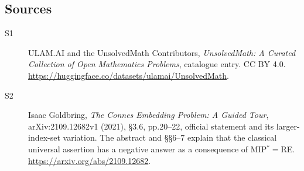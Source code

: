 \documentclass[11pt]{article}
\begin{document}
\subsection{Sources}
\begin{description}
\item[\hypertarget{source:statement:1}{S1}] ULAM.AI and the UnsolvedMath Contributors, \emph{UnsolvedMath: A Curated Collection of Open Mathematics Problems}, catalogue entry. CC BY 4.0. \url{https://huggingface.co/datasets/ulamai/UnsolvedMath}.
\item[\hypertarget{source:statement:2}{S2}] Isaac Goldbring, \emph{The Connes Embedding Problem: A Guided Tour}, arXiv:2109.12682v1 (2021), §3.6, pp.20--22, official statement and its larger-index-set variation. The abstract and §§6--7 explain that the classical universal assertion has a negative answer as a consequence of MIP$^*=$RE. \url{https://arxiv.org/abs/2109.12682}.
\end{description}
\label{end:statement}
\end{document}
